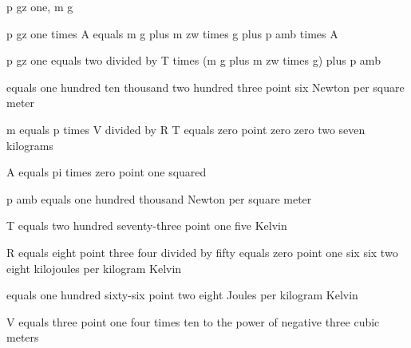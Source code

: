 p gz one, m g

p gz one times A equals m g plus m zw times g plus p amb times A

p gz one equals two divided by T times (m g plus m zw times g) plus p amb

equals one hundred ten thousand two hundred three point six Newton per square meter

m equals p times V divided by R T equals zero point zero zero two seven kilograms

A equals pi times zero point one squared

p amb equals one hundred thousand Newton per square meter

T equals two hundred seventy-three point one five Kelvin

R equals eight point three four divided by fifty equals zero point one six six two eight kilojoules per kilogram Kelvin

equals one hundred sixty-six point two eight Joules per kilogram Kelvin

V equals three point one four times ten to the power of negative three cubic meters